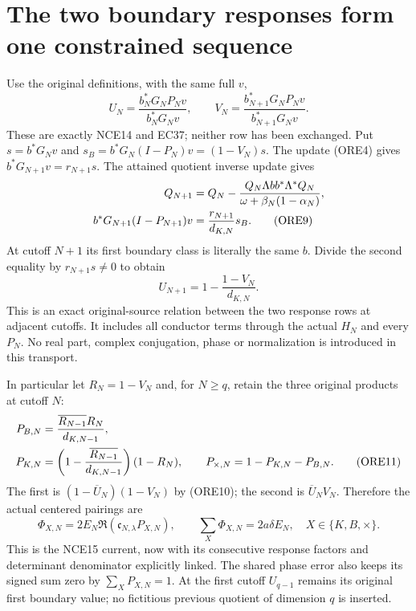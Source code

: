 \documentclass[11pt,a4paper]{article}
\begin{document}
\section{The two boundary responses form one constrained sequence}
Use the original definitions, with the same full $v$,
\[
 U_N=\frac{b_N^*G_NP_Nv}{b_N^*G_Nv},\qquad
 V_N=\frac{b_{N+1}^*G_NP_Nv}{b_{N+1}^*G_Nv}.           \tag{ORE8}
\]
These are exactly NCE14 and EC37; neither row has been exchanged.
Put $s=b^*G_Nv$ and $s_B=b^*G_N(I-P_N)v=(1-V_N)s$.
The update (ORE4) gives $b^*G_{N+1}v=r_{N+1}s$.
The attained quotient inverse update gives
\begin{align}
 Q_{N+1}&=Q_N-
 \frac{Q_N\Lambda b b^*\Lambda^*Q_N}
 {\omega+\beta_N(1-\alpha_N)},\notag\\
 b^*G_{N+1}(I-P_{N+1})v
 &=\frac{r_{N+1}}{d_{K,N}}s_B.                       \tag{ORE9}
\end{align}
At cutoff $N+1$ its first boundary class is literally the same $b$.
Divide the second equality by $r_{N+1}s\ne0$ to obtain
\begin{equation}\tag{ORE10}
 \boxed{\displaystyle
 U_{N+1}=1-\frac{1-V_N}{d_{K,N}}.}
\end{equation}
This is an exact original-source relation between the two response
rows at adjacent cutoffs. It includes all conductor terms through
the actual $H_N$ and every $P_N$. No real part, complex conjugation,
phase or normalization is introduced in this transport.

In particular let $R_N=1-V_N$ and, for $N\ge q$, retain the three
original products at cutoff $N$:
\begin{align}
 P_{B,N}&=\frac{\overline{R_{N-1}}R_N}{d_{K,N-1}},\notag\\
 P_{K,N}&=\left(1-\frac{\overline{R_{N-1}}}{d_{K,N-1}}\right)(1-R_N),
 \qquad P_{\times,N}=1-P_{K,N}-P_{B,N}.                \tag{ORE11}
\end{align}
The first is $(1-\overline U_N)(1-V_N)$ by (ORE10); the second
is $\overline U_NV_N$. Therefore the actual centered pairings are
\begin{equation}\tag{ORE12}
 \Phi_{X,N}=2E_N\Re(\mathfrak c_{N,\lambda}P_{X,N}),\qquad
 \sum_X\Phi_{X,N}=2a\delta E_N,
 \quad X\in\{K,B,\times\}.
\end{equation}
This is the NCE15 current, now with its consecutive response factors
and determinant denominator explicitly linked. The shared phase error
also keeps its signed sum zero by $\sum_XP_{X,N}=1$.
At the first cutoff $U_{q-1}$ remains its original first boundary value;
no fictitious previous quotient of dimension $q$ is inserted.
\end{document}
